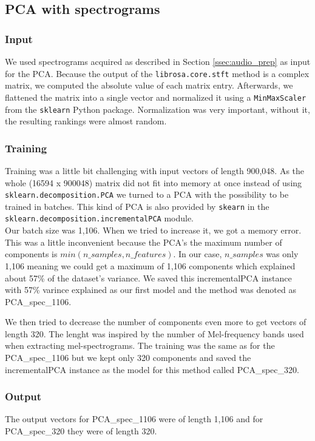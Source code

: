 \subsection{PCA with spectrograms}\label{ssec:PCA_spec_experiments}

\subsubsection{Input}
We used spectrograms acquired as described in Section \ref{ssec:audio_prep} as input for the PCA. Because the output of the \texttt{librosa.core.stft} method is a complex matrix, we computed the absolute value of each matrix entry. Afterwards, we flattened the matrix into a single vector and normalized it using a \texttt{MinMaxScaler} from the \texttt{sklearn} Python package. Normalization was very important, without it, the resulting rankings were almost random.

\subsubsection{Training}
Training was a little bit challenging with input vectors of length 900,048. As the whole (16594 x 900048) matrix did not fit into memory at once instead of using \texttt{sklearn.decomposition.PCA} we turned to a PCA with the possibility to be trained in batches. This kind of PCA is also provided by \texttt{skearn} in the \texttt{sklearn.decomposition.incrementalPCA} module. \\ 
Our batch size was 1,106. When we tried to increase it, we got a memory error. This was a little inconvenient because the PCA's the maximum number of components is $min(n\_samples, n\_features)$. In our case, $n\_samples$ was only 1,106 meaning we could get a maximum of 1,106 components which explained about 57\% of the dataset's variance. We saved this incrementalPCA instance with 57\% varince explained as our first model and the method was denoted as PCA\_spec\_1106. 

We then tried to decrease the number of components even more to get vectors of length 320. The lenght was inspired by the number of Mel-frequency bands used when extracting mel-spectrograms. The training was the same as for the PCA\_spec\_1106 but we kept only 320 components and saved the incrementalPCA instance as the model for this method called PCA\_spec\_320.

\subsubsection{Output}
The output vectors for PCA\_spec\_1106 were of length 1,106 and for PCA\_spec\_320 they were of length 320.

